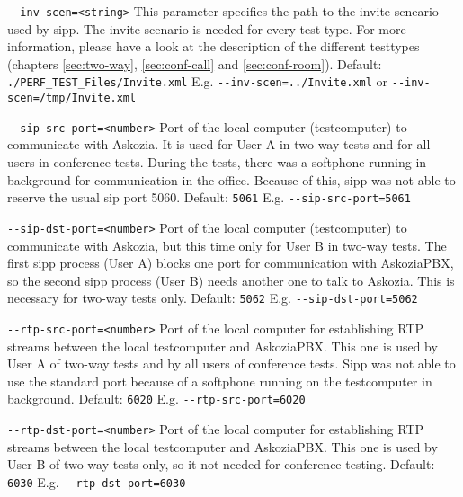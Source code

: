 \begin {description}
\item {\texttt{-{}-inv-scen=<string>}} \newline
This parameter specifies the path to the invite scneario used by sipp.
The invite scenario is needed for every test type.
For more information, please have a look at the description of the
different testtypes (chapters \ref{sec:two-way}, \ref{sec:conf-call} and \ref{sec:conf-room}).
\newline Default: \texttt{./PERF\_TEST\_Files/Invite.xml}
\newline E.g. \texttt{-{}-inv-scen=../Invite.xml} or \texttt{-{}-inv-scen=/tmp/Invite.xml}

\item {\texttt{-{}-sip-src-port=<number>}} \newline
Port of the local computer (testcomputer) to communicate with Askozia.
It is used for User A in two-way tests and for all users in conference tests.
During the tests, there was a softphone running in background for communication
in the office. Because of this, sipp was not able to reserve the usual sip port 5060.
\newline Default: \texttt{5061}
\newline E.g. \texttt{-{}-sip-src-port=5061}

\item {\texttt{-{}-sip-dst-port=<number>}} \newline
Port of the local computer (testcomputer) to communicate with Askozia,
but this time only for User B in two-way tests. The first sipp process
(User A) blocks one port for communication with AskoziaPBX,
so the second sipp process (User B) needs another one to talk to Askozia.
This is necessary for two-way tests only.
\newline Default: \texttt{5062}
\newline E.g. \texttt{-{}-sip-dst-port=5062}

\item {\texttt{-{}-rtp-src-port=<number>}} \newline
Port of the local computer for establishing RTP streams between the local testcomputer
and AskoziaPBX. This one is used by User A of two-way tests and by all users of
conference tests. Sipp was not able to use the standard port because of a
softphone running on the testcomputer in background.
\newline Default: \texttt{6020}
\newline E.g. \texttt{-{}-rtp-src-port=6020}

\item {\texttt{-{}-rtp-dst-port=<number>}} \newline
Port of the local computer for establishing RTP streams between the local testcomputer
and AskoziaPBX. This one is used by User B of two-way tests only, so it not needed
for conference testing.
\newline Default: \texttt{6030}
\newline E.g. \texttt{-{}-rtp-dst-port=6030}


\end{description}
